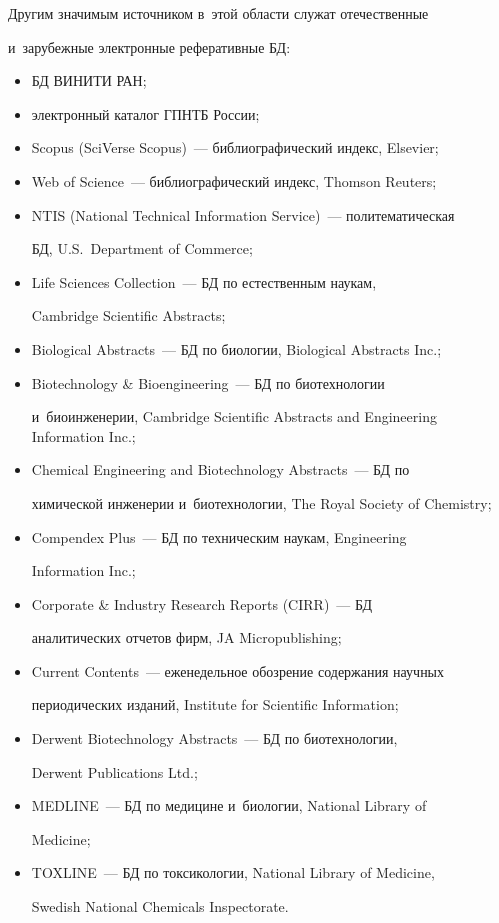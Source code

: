     Другим значимым источником в~этой области служат отечественные 

и~зарубежные электронные реферативные БД:

    \begin{itemize}

\item БД ВИНИТИ РАН;

\item электронный каталог ГПНТБ России;

\item Scopus (SciVerse Scopus)~--- библиографический индекс, Elsevier;

\item Web of Science~--- библиографический индекс, Thomson Reuters;

\item NTIS (National Technical Information Service)~--- политематическая 

БД, U.S.\ Department of Commerce;

\item Life Sciences Collection~--- БД по естественным наукам, 

Cambridge Scientific Abstracts;

\item Biological Abstracts~--- БД по биологии, Biological Abstracts Inc.;

\item Biotechnology \& Bioengineering~--- БД по биотехнологии 

и~биоинженерии, Cambridge Scientific Abstracts and Engineering Information Inc.;

\item Chemical Engineering and Biotechnology Abstracts~--- БД по 

химической инженерии и~биотехнологии, The Royal Society of Chemistry;

\item Compendex Plus~--- БД по техническим наукам, Engineering 

Information Inc.;

\item Corporate \& Industry Research Reports (CIRR)~--- БД

аналитических отчетов фирм, JA Micropublishing;

\item Current Contents~--- еженедельное обозрение содержания научных 

периодических изданий, Institute for Scientific Information;

\item Derwent Biotechnology Abstracts~--- БД по биотехнологии, 

Derwent Publications Ltd.;

\item MEDLINE~--- БД по медицине и~биологии, National Library of 

Medicine;

\item TOXLINE~--- БД по токсикологии, National Library of Medicine, 

Swedish National Chemicals Inspectorate.

    \end{itemize}

